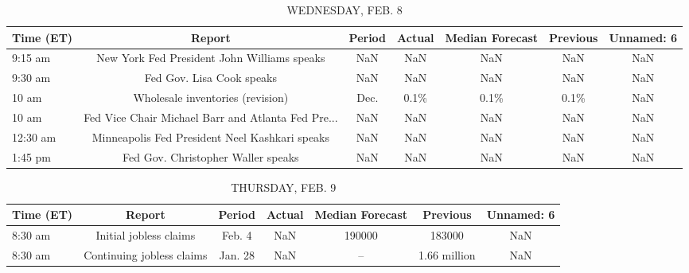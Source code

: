 \documentclass{article}%
\begin{document}
\begin{table}[htbp]%
\caption{WEDNESDAY, FEB. 8}%
\centering%
\begin{adjustbox}{width=1\textwidth}%
\begin{tabular}{lcccccc}
\toprule
Time (ET) &                                             Report & Period & Actual & Median Forecast & Previous & Unnamed: 6 \\
\midrule
  9:15 am &        New York Fed President John Williams speaks &    NaN &    NaN &             NaN &      NaN &        NaN \\
  9:30 am &                          Fed Gov. Lisa Cook speaks &    NaN &    NaN &             NaN &      NaN &        NaN \\
    10 am &                   Wholesale inventories (revision) &   Dec. &   0.1\% &            0.1\% &     0.1\% &        NaN \\
    10 am & Fed Vice Chair Michael Barr and Atlanta Fed Pre... &    NaN &    NaN &             NaN &      NaN &        NaN \\
 12:30 am &     Minneapolis Fed President Neel Kashkari speaks &    NaN &    NaN &             NaN &      NaN &        NaN \\
  1:45 pm &                 Fed Gov. Christopher Waller speaks &    NaN &    NaN &             NaN &      NaN &        NaN \\
\bottomrule
\end{tabular}
%
\end{adjustbox}%
\end{table}

%


\begin{table}[htbp]%
\caption{THURSDAY, FEB. 9}%
\centering%
\begin{adjustbox}{width=1\textwidth}%
\begin{tabular}{lcccccc}
\toprule
Time (ET) &                    Report &  Period & Actual & Median Forecast &     Previous & Unnamed: 6 \\
\midrule
  8:30 am &    Initial jobless claims &  Feb. 4 &    NaN &          190000 &       183000 &        NaN \\
  8:30 am & Continuing jobless claims & Jan. 28 &    NaN &              -- & 1.66 million &        NaN \\
\bottomrule
\end{tabular}
%
\end{adjustbox}%
\end{table}
\end{document}
